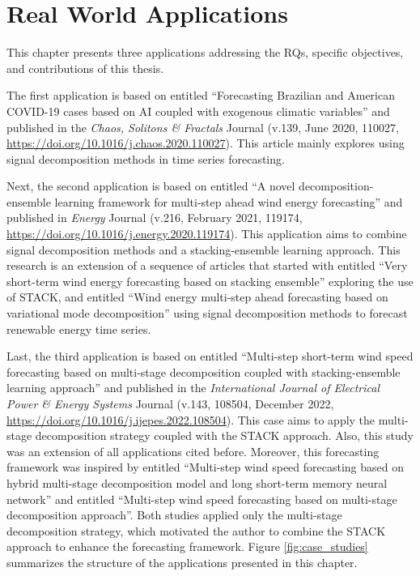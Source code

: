 \chapter{Real World Applications} \label{chap:realworld}

This chapter presents three applications addressing the \ac{RQ}s, specific objectives, and contributions of this thesis.

The first application is based on  entitled ``Forecasting Brazilian and American COVID-19 cases based on \ac{AI} coupled with exogenous climatic variables'' and published in the \textit{Chaos, Solitons \& Fractals} Journal (v.139, June 2020, 110027, \url{https://doi.org/10.1016/j.chaos.2020.110027}). This article mainly explores using signal decomposition methods in time series forecasting.

Next, the second application is based on  entitled ``A novel decomposition-ensemble learning framework for multi-step ahead wind energy forecasting'' and published in \textit{Energy} Journal (v.216, February 2021, 119174, \url{https://doi.org/10.1016/j.energy.2020.119174}). This application aims to combine signal decomposition methods and a stacking-ensemble learning approach. This research is an extension of a sequence of articles that started with  entitled ``Very short-term wind energy forecasting based on stacking ensemble'' exploring the use of \ac{STACK}, and  entitled ``Wind energy multi-step ahead forecasting based on variational mode decomposition'' using signal decomposition methods to forecast renewable energy time series.

Last, the third application is based on  entitled ``Multi-step short-term wind speed forecasting based on multi-stage decomposition coupled with stacking-ensemble learning approach'' and published in the \textit{International Journal of Electrical Power \& Energy Systems} Journal (v.143, 108504, December 2022, \url{https://doi.org/10.1016/j.ijepes.2022.108504}). This case aims to apply the multi-stage decomposition strategy coupled with the \ac{STACK} approach. Also, this study was an extension of all applications cited before. Moreover, this forecasting framework was inspired by  entitled ``Multi-step wind speed forecasting based on hybrid multi-stage decomposition model and long short-term memory neural network'' and  entitled ``Multi-step wind speed forecasting based on multi-stage decomposition approach''. Both studies applied only the multi-stage decomposition strategy, which motivated the author to combine the \ac{STACK} approach to enhance the forecasting framework. Figure \ref{fig:case_studies} summarizes the structure of the applications presented in this chapter.

